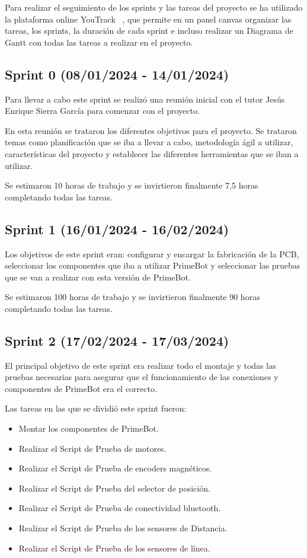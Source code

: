Para realizar el seguimiento de los sprints y las tareas del proyecto se ha utilizado la plataforma online YouTrack ~\cite{youtrack}, que permite en un panel canvas organizar las tareas, los sprints, la duración de cada sprint e incluso realizar un Diagrama de Gantt con todas las tareas a realizar en el proyecto.

\subsection {Sprint 0 (08/01/2024 - 14/01/2024)}

Para llevar a cabo este sprint se realizó una reunión inicial con el tutor Jesús Enrique Sierra García para comenzar con el proyecto.

En esta reunión se trataron los diferentes objetivos para el proyecto.
Se trataron temas como planificación que se iba a llevar a cabo, metodología ágil a utilizar, características del proyecto y establecer las diferentes herramientas que se iban a utilizar.

Se estimaron 10 horas de trabajo y se invirtieron finalmente 7,5 horas completando todas las tareas.

 \subsection {Sprint 1 (16/01/2024 - 16/02/2024)}
Los objetivos de este sprint eran: configurar y encargar la fabricación de la PCB, seleccionar los componentes que iba a utilizar PrimeBot y seleccionar las pruebas que se van a realizar con esta versión de PrimeBot.

Se estimaron 100 horas de trabajo y se invirtieron finalmente 90 horas completando todas las tareas.
 
 \subsection {Sprint 2 (17/02/2024 - 17/03/2024)}
 
El principal objetivo de este sprint era realizar todo el montaje y todas las pruebas necesarias para asegurar que el funcionamiento de las conexiones y componentes de PrimeBot era el correcto.

Las tareas en las que se dividió este sprint fueron:
 \begin{itemize}
\tightlist
\item
  Montar los componentes de PrimeBot.
\item
  Realizar el Script de Prueba de motores.
\item
  Realizar el Script de Prueba de encoders magnéticos.
  \item
  Realizar el Script de Prueba del selector de posición.
  \item
  Realizar el Script de Prueba de conectividad bluetooth.
    \item
  Realizar el Script de Prueba de los sensores de Distancia.
    \item
  Realizar el Script de Prueba de los sensores de línea.
\end{itemize}

